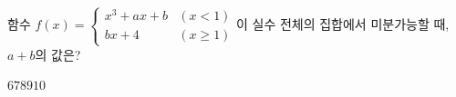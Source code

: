 함수 $f(x)=\begin{cases} x^3+ax+b & (x<1) \\ bx+4 & (x\ge 1) \end{cases}$이 실수 전체의 집합에서 미분가능할 때, $a+b$의 값은? 
\begin{choices32}{$6$}{$7$}{$8$}{$9$}{$10$}\end{choices32}
